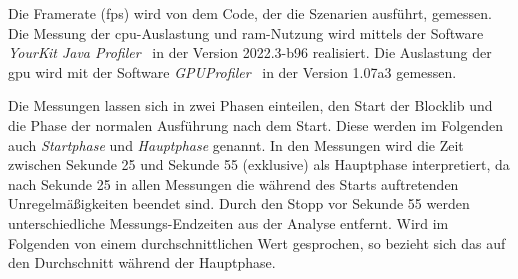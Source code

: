 Die Framerate (\ac{fps}) wird von dem Code, der die Szenarien ausführt, gemessen. Die Messung der \ac{cpu}-Auslastung und \ac{ram}-Nutzung wird mittels der Software \emph{YourKit Java Profiler}~\cite{YourKitGmbH} in der Version 2022.3-b96 realisiert. Die Auslastung der \ac{gpu} wird mit der Software \emph{GPUProfiler}~\cite{Main2021} in der Version 1.07a3 gemessen. 

Die Messungen lassen sich in zwei Phasen einteilen, den Start der Blocklib und die Phase der normalen Ausführung nach dem Start. Diese werden im Folgenden auch \emph{Startphase} und \emph{Hauptphase} genannt. In den Messungen wird die Zeit zwischen Sekunde 25 und Sekunde 55 (exklusive) als Hauptphase interpretiert, da nach Sekunde 25 in allen Messungen die während des Starts auftretenden Unregelmäßigkeiten beendet sind. Durch den Stopp vor Sekunde 55 werden unterschiedliche Messungs-Endzeiten aus der Analyse entfernt. Wird im Folgenden von einem durchschnittlichen Wert gesprochen, so bezieht sich das auf den Durchschnitt während der Hauptphase.